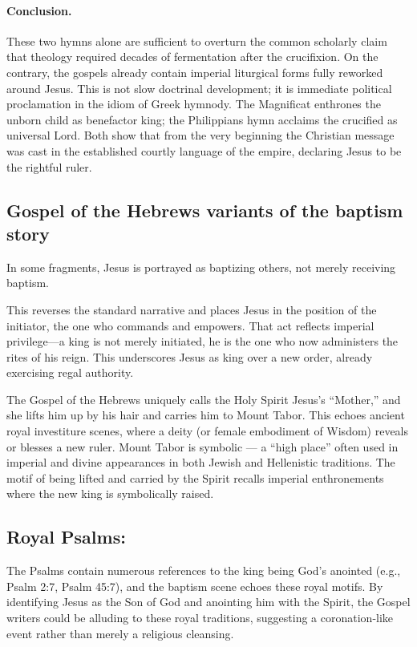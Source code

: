 \paragraph{Conclusion.}
These two hymns alone are sufficient to overturn the common scholarly claim that theology required decades of fermentation after the crucifixion.
On the contrary, the gospels already contain imperial liturgical forms fully reworked around Jesus.
This is not slow doctrinal development; it is immediate political proclamation in the idiom of Greek hymnody.
The Magnificat enthrones the unborn child as benefactor king; the Philippians hymn acclaims the crucified as universal Lord.
Both show that from the very beginning the Christian message was cast in the established courtly language of the empire, declaring Jesus to be the rightful ruler.


\subsection{Gospel of the Hebrews variants of the baptism story}\label{subsec:gospel-of-the-hebrews-variants-of-the-baptism-story}

In some fragments, Jesus is portrayed as baptizing others, not merely receiving baptism.

This reverses the standard narrative and places Jesus in the position of the initiator, the one who commands and empowers.
That act reflects imperial privilege---a king is not merely initiated, he is the one who now administers the rites of his reign.
This underscores Jesus as king over a new order, already exercising regal authority.

The Gospel of the Hebrews uniquely calls the Holy Spirit Jesus's ``Mother,'' and she lifts him up by his hair and carries him to Mount Tabor.
This echoes ancient royal investiture scenes, where a deity (or female embodiment of Wisdom) reveals or blesses a new ruler.
Mount Tabor is symbolic --- a ``high place'' often used in imperial and divine appearances in both Jewish and Hellenistic traditions.
The motif of being lifted and carried by the Spirit recalls imperial enthronements where the new king is symbolically raised.

\subsection{Royal Psalms:}\label{par:royal-psalms}

The Psalms contain numerous references to the king being God's anointed (e.g., Psalm 2:7, Psalm 45:7), and the baptism scene echoes these royal motifs.
By identifying Jesus as the Son of God and anointing him with the Spirit, the Gospel writers could be alluding to these royal traditions, suggesting a coronation-like event rather than merely a religious cleansing.

